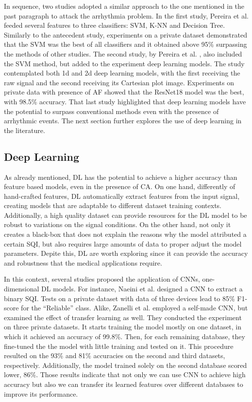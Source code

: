 In sequence, two studies adopted a similar approach to the one mentioned in the past paragraph to attack the arrhythmia problem. In the first study, Pereira et al. \cite{arrhythmia-3} feeded several features to three classifiers: \gls{SVM}, \gls{K-NN} and Decision Tree. Similarly to the antecedent study, experiments on a private dataset demonstrated that the \gls{SVM} was the best of all classifiers and it obtained above 95\% surpassing the methods of other studies. The second study, by Pereira et al. \cite{arrhythmia-4}, also included the \gls{SVM} method, but added to the experiment deep learning models. The study contemplated both 1d and 2d deep learning models, with the first receiving the raw signal and the second receiving its Cartesian plot image. Experiments on private data with presence of \gls{AF} showed that the ResNet18 model was the best, with 98.5\% accuracy. That last study highlighted that deep learning models have the potential to surpass conventional methods even with the presence of arrhythmic events. The next section further explores the use of deep learning in the literature.  

\subsection{Deep Learning}
\label{sec:deep_learning}

As already mentioned, \gls{DL} has the potential to achieve a higher accuracy than feature based models, even in the presence of \gls{CA}. On one hand, differently of hand-crafted features, \gls{DL} automatically extract features from the input signal, creating models that are adaptable to different dataset training contexts. Additionally, a high quality dataset can provide resources for the \gls{DL} model to be robust to variations on the signal conditions. On the other hand, not only it creates a black-box that does not explain the reasons why the model attributed a certain \gls{SQI}, but also requires large amounts of data to proper adjust the model parameters. Depite this, \gls{DL} are worth exploring since it can provide the accuracy and robustness that the medical applications require. 

In this context, several studies proposed the application of \gls{CNN}s, one-dimensional \gls{DL} models. For instance, Naeini et al. \cite{deep-learning-1} designed a \gls{CNN} to extract a binary \gls{SQI}. Tests on a private dataset with data of three devices lead to 85\% F1-score for the ``Reliable'' class. Alike, Zanelli et al. \cite{deep-learning-2} employed a self-made \gls{CNN}, but examined the effect of transfer learning as well. They conducted the experiment on three private datasets. It starts training the model mostly on one dataset, in which it achieved an accuracy of 99.8\%. Then, for each remaining database, they fine-tuned the the model with little training and tested on it. This procedure resulted on the 93\% and 81\% accuracies on the second and third datasets, respectively. Additionally, the model trained solely on the second database scored lower, 86\%. Those results indicate that not only we can use \gls{CNN} to achieve high accuracy but also we can transfer its learned features over different databases to improve its performance.

